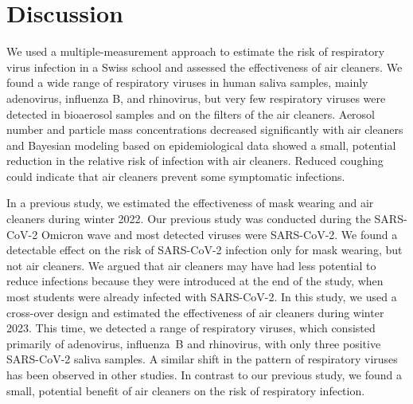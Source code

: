 \documentclass[fleqn,11pt]{wlscirep}
\begin{document}
\newpage

\section{Discussion}


We used a multiple-measurement approach to estimate the risk of respiratory virus infection in a Swiss school and assessed the effectiveness of air cleaners. We found a wide range of respiratory viruses in human saliva samples, mainly adenovirus, influenza B, and rhinovirus, but very few respiratory viruses were detected in bioaerosol samples and on the filters of the air cleaners. Aerosol number and particle mass concentrations decreased significantly with air cleaners and Bayesian modeling based on epidemiological data showed a small, potential reduction in the relative risk of infection with air cleaners. Reduced coughing could indicate that air cleaners prevent some symptomatic infections.


In a previous study\cite{Banholzer2023PLoSMed}, we estimated the effectiveness of mask wearing and air cleaners during winter 2022. Our previous study was conducted during the SARS-CoV-2 Omicron wave and most detected viruses were SARS-CoV-2. We found a detectable effect on the risk of SARS-CoV-2 infection only for mask wearing, but not air cleaners. We argued that air cleaners may have had less potential to reduce infections because they were introduced at the end of the study, when most students were already infected with SARS-CoV-2. In this study, we used a cross-over design and estimated the effectiveness of air cleaners during winter 2023. This time, we detected a range of respiratory viruses, which consisted primarily of adenovirus, influenza~B and rhinovirus, with only three positive SARS-CoV-2 saliva samples. A similar shift in the pattern of respiratory viruses has been observed in other studies\cite{Nygaard2023Lancet,Sauteur2022EuroSurv}. In contrast to our previous study, we found a small, potential benefit of air cleaners on the risk of respiratory infection. 

\end{document}

